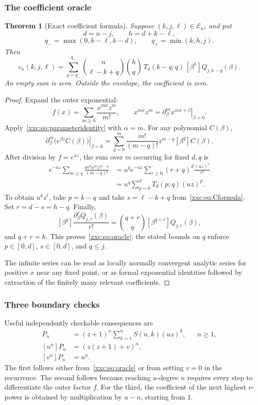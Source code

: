 \documentclass[11pt,a4paper]{article}
\numberwithin{equation}{section}
\newtheorem{theorem}{Theorem}[section]
\theoremstyle{definition}
\theoremstyle{remark}
\theoremstyle{plain}
\newcommand{\fall}[2]{#1^{\underline{#2}}}
\begin{document}
\subsubsection{The coefficient oracle}

\begin{theorem}[Exact coefficient formula]\label{xxc:thm:oracle}
Suppose $(k,j,\ell)\in\mathcal E_n$, and put
\[
 d=n-j,\qquad h=d+k-\ell,
\]
\[
 q_- =\max(0,k-\ell,k-d),\qquad q_+=\min(k,h,j).
\]
Then
\begin{equation}\label{xxc:eq:oracle}
\boxed{\displaystyle
 c_n(k,j,\ell)=\sum_{q=q_-}^{q_+}
 \binom n{\ell-k+q}\binom hq\,
 T_d(k-q;q)\,[\beta^h]Q_{j,h-q}(\beta).}
\end{equation}
An empty sum is zero. Outside the envelope, the coefficient is zero.
\end{theorem}
\begin{proof}
Expand the outer exponential:
\[
 f(x)=\sum_{m\ge0}\frac{x^{mx}z^m}{m!},\qquad
 x^{mx}z^m=\left.\partial_\beta^m x^{mx+\beta}\right|_{\beta=0}.
\]
Apply~\eqref{xxc:eq:parameteridentity} with $\alpha=m$. For any polynomial
$C(\beta)$,
\[
 \left.\partial_\beta^m\bigl(e^{\beta z}C(\beta)\bigr)\right|_{\beta=0}
 =\sum_{q=0}^m\frac{m!}{(m-q)!}z^{m-q}[\beta^q]C(\beta).
\]
After division by $f=e^{uz}$, the sum over $m$ occurring for fixed $d,q$ is
\begin{align*}
 e^{-uz}\sum_{m\ge q}\frac{m^d u^m z^{m-q}}{(m-q)!}
 &=u^q e^{-uz}\sum_{r\ge0}(r+q)^d\frac{(uz)^r}{r!}\\
 &=u^q\sum_{p=0}^dT_d(p;q)(uz)^p.
\end{align*}
To obtain $u^kz^\ell$, take $p=k-q$ and take
$s=\ell-k+q$ from~\eqref{xxc:eq:Cformula}. Set $r=d-s=h-q$.
Finally,
\[
 [\beta^q]\frac{\partial_\beta^rQ_{j,r}(\beta)}{r!}
 =\binom{q+r}{q}[\beta^{q+r}]Q_{j,r}(\beta),
\]
and $q+r=h$. This proves~\eqref{xxc:eq:oracle}; the stated bounds on $q$ enforce
$p\in[0,d]$, $s\in[0,d]$, and $q\le j$.

The infinite series can be read as locally normally convergent analytic
series for positive $x$ near any fixed point, or as formal exponential
identities followed by extraction of the finitely many relevant coefficients.
\end{proof}

\subsubsection{Three boundary checks}

Useful independently checkable consequences are
\begin{align}
 [v^0]P_n&=(z+1)^n\sum_{k=1}^nS(n,k)(uz)^k,
                 &&n\ge1,\label{xxc:eq:vzero}\\
 [u^n]P_n&=(z(z+1)+v)^n,\label{xxc:eq:umax}\\
 [v^n]P_n&=\fall{u}{n}.\label{xxc:eq:vmax}
\end{align}
The first follows either from~\eqref{xxc:eq:oracle} or from setting $v=0$ in the
recurrence. The second follows because reaching $u$-degree $n$ requires every
step to differentiate the outer factor $f$. For the third, the coefficient
of the next highest $v$-power is obtained by multiplication by $u-n$,
starting from $1$.
\end{document}
